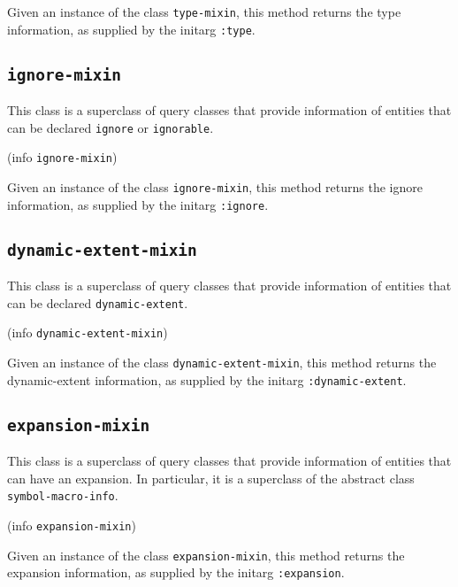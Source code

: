 Given an instance of the class \texttt{type-mixin}, this method
returns the type information, as supplied by the initarg
\texttt{:type}.

\subsection{\texttt{ignore-mixin}}
\label{sec-ignore-mixin}


This class is a superclass of query classes that provide information
of entities that can be declared \texttt{ignore} or \texttt{ignorable}.


 {(info {\tt ignore-mixin})}

Given an instance of the class \texttt{ignore-mixin}, this method
returns the ignore information, as supplied by the initarg
\texttt{:ignore}.

\subsection{\texttt{dynamic-extent-mixin}}
\label{sec-dynamic-extent-mixin}


This class is a superclass of query classes that provide information
of entities that can be declared \texttt{dynamic-extent}.


 {(info {\tt dynamic-extent-mixin})}

Given an instance of the class \texttt{dynamic-extent-mixin}, this method
returns the dynamic-extent information, as supplied by the initarg
\texttt{:dynamic-extent}.

\subsection{\texttt{expansion-mixin}}
\label{sec-expansion-mixin}

This class is a superclass of query classes that provide information
of entities that can have an expansion.  In particular, it is a
superclass of the abstract class \texttt{symbol-macro-info}.


 {(info {\tt expansion-mixin})}

Given an instance of the class \texttt{expansion-mixin}, this method
returns the expansion information, as supplied by the initarg
\texttt{:expansion}.

